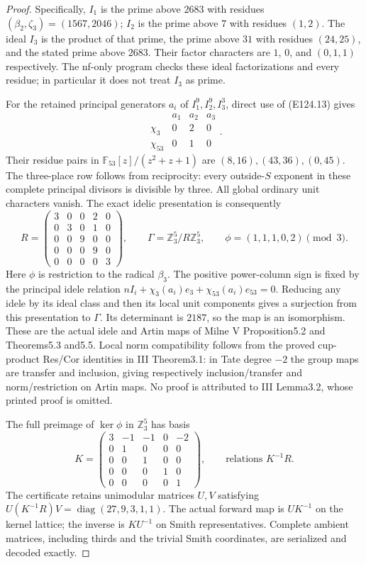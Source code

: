 \begin{proof}
Specifically, $I_1$ is the prime above $2683$ with residues
$(\beta_2,\zeta_3)=(1567,2046)$; $I_2$ is the prime above
$7$ with residues $(1,2)$. The ideal $I_3$ is the product
of that prime, the prime above $31$ with residues $(24,25)$,
and the stated prime above $2683$. Their factor characters
are $1$, $0$, and $(0,1,1)$ respectively. The nf-only
program checks these ideal factorizations and every residue;
in particular it does not treat $I_3$ as prime.

For the retained principal generators $a_i$ of
$I_1^9,I_2^9,I_3^3$, direct use of (E124.13) gives
\[
 \begin{array}{c|ccc}
 &a_1&a_2&a_3\\ \hline
 \chi_3&0&2&0\\
 \chi_{53}&0&1&0
 \end{array}.
 \tag{E124.16}
\]
Their residue pairs in $\mathbb F_{53}[z]/(z^2+z+1)$
are $(8,16),(43,36),(0,45)$. The three-place row follows
from reciprocity: every outside-$S$ exponent in these complete
principal divisors is divisible by three. All global ordinary
unit characters vanish. The exact idelic presentation is consequently
\[
 R=\begin{pmatrix}
 3&0&0&2&0\\0&3&0&1&0\\0&0&9&0&0\\
 0&0&0&9&0\\0&0&0&0&3
 \end{pmatrix},\qquad
 \Gamma=\mathbb Z_3^5/R\mathbb Z_3^5,\qquad
 \phi=(1,1,1,0,2)\pmod3.
 \tag{E124.17}
\]
Here $\phi$ is restriction to the radical $\beta_3$.
The positive power-column sign is fixed by the principal
idele relation
$nI_i+\chi_3(a_i)e_3+\chi_{53}(a_i)e_{53}=0$.
Reducing any idele by its ideal class and then its local
unit components gives a surjection from this presentation
to $\Gamma$. Its determinant is $2187$, so the map is an
isomorphism. These are the actual idele and Artin maps of
Milne V Proposition5.2 and Theorems5.3 and5.5.
Local norm compatibility follows from the proved cup-product
Res/Cor identities in III Theorem3.1: in Tate degree $-2$
the group maps are transfer and inclusion, giving respectively
inclusion/transfer and norm/restriction on Artin maps.
No proof is attributed to III Lemma3.2, whose printed proof
is omitted.

The full preimage of $\ker\phi$ in $\mathbb Z_3^5$ has basis
\[
 K=\begin{pmatrix}
 3&-1&-1&0&-2\\0&1&0&0&0\\0&0&1&0&0\\
 0&0&0&1&0\\0&0&0&0&1
 \end{pmatrix},\qquad \text{relations }K^{-1}R.
 \tag{E124.18}
\]
The certificate retains unimodular matrices $U,V$ satisfying
$U(K^{-1}R)V=\operatorname{diag}(27,9,3,1,1)$.
The actual forward map is $UK^{-1}$ on the kernel lattice;
the inverse is $KU^{-1}$ on Smith representatives. Complete
ambient matrices, including thirds and the trivial Smith
coordinates, are serialized and decoded exactly.


\end{proof}
